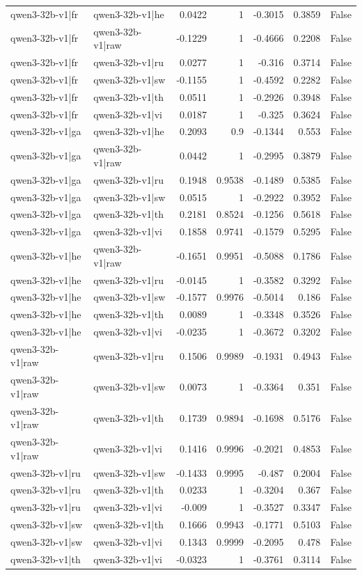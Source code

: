 \begin{table}
\begin{tabular}{l l r r r r l}
qwen3-32b-v1|fr & qwen3-32b-v1|he & 0.0422 & 1 & -0.3015 & 0.3859 & False \\
qwen3-32b-v1|fr & qwen3-32b-v1|raw & -0.1229 & 1 & -0.4666 & 0.2208 & False \\
qwen3-32b-v1|fr & qwen3-32b-v1|ru & 0.0277 & 1 & -0.316 & 0.3714 & False \\
qwen3-32b-v1|fr & qwen3-32b-v1|sw & -0.1155 & 1 & -0.4592 & 0.2282 & False \\
qwen3-32b-v1|fr & qwen3-32b-v1|th & 0.0511 & 1 & -0.2926 & 0.3948 & False \\
qwen3-32b-v1|fr & qwen3-32b-v1|vi & 0.0187 & 1 & -0.325 & 0.3624 & False \\
qwen3-32b-v1|ga & qwen3-32b-v1|he & 0.2093 & 0.9 & -0.1344 & 0.553 & False \\
qwen3-32b-v1|ga & qwen3-32b-v1|raw & 0.0442 & 1 & -0.2995 & 0.3879 & False \\
qwen3-32b-v1|ga & qwen3-32b-v1|ru & 0.1948 & 0.9538 & -0.1489 & 0.5385 & False \\
qwen3-32b-v1|ga & qwen3-32b-v1|sw & 0.0515 & 1 & -0.2922 & 0.3952 & False \\
qwen3-32b-v1|ga & qwen3-32b-v1|th & 0.2181 & 0.8524 & -0.1256 & 0.5618 & False \\
qwen3-32b-v1|ga & qwen3-32b-v1|vi & 0.1858 & 0.9741 & -0.1579 & 0.5295 & False \\
qwen3-32b-v1|he & qwen3-32b-v1|raw & -0.1651 & 0.9951 & -0.5088 & 0.1786 & False \\
qwen3-32b-v1|he & qwen3-32b-v1|ru & -0.0145 & 1 & -0.3582 & 0.3292 & False \\
qwen3-32b-v1|he & qwen3-32b-v1|sw & -0.1577 & 0.9976 & -0.5014 & 0.186 & False \\
qwen3-32b-v1|he & qwen3-32b-v1|th & 0.0089 & 1 & -0.3348 & 0.3526 & False \\
qwen3-32b-v1|he & qwen3-32b-v1|vi & -0.0235 & 1 & -0.3672 & 0.3202 & False \\
qwen3-32b-v1|raw & qwen3-32b-v1|ru & 0.1506 & 0.9989 & -0.1931 & 0.4943 & False \\
qwen3-32b-v1|raw & qwen3-32b-v1|sw & 0.0073 & 1 & -0.3364 & 0.351 & False \\
qwen3-32b-v1|raw & qwen3-32b-v1|th & 0.1739 & 0.9894 & -0.1698 & 0.5176 & False \\
qwen3-32b-v1|raw & qwen3-32b-v1|vi & 0.1416 & 0.9996 & -0.2021 & 0.4853 & False \\
qwen3-32b-v1|ru & qwen3-32b-v1|sw & -0.1433 & 0.9995 & -0.487 & 0.2004 & False \\
qwen3-32b-v1|ru & qwen3-32b-v1|th & 0.0233 & 1 & -0.3204 & 0.367 & False \\
qwen3-32b-v1|ru & qwen3-32b-v1|vi & -0.009 & 1 & -0.3527 & 0.3347 & False \\
qwen3-32b-v1|sw & qwen3-32b-v1|th & 0.1666 & 0.9943 & -0.1771 & 0.5103 & False \\
qwen3-32b-v1|sw & qwen3-32b-v1|vi & 0.1343 & 0.9999 & -0.2095 & 0.478 & False \\
qwen3-32b-v1|th & qwen3-32b-v1|vi & -0.0323 & 1 & -0.3761 & 0.3114 & False \\
\bottomrule
\end{tabular}
\end{table}
